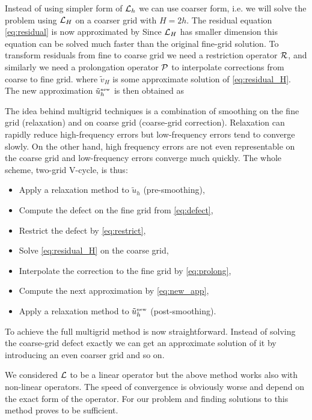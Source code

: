 Instead of using simpler form of $\mathcal{L}_h$ we can use coarser form, i.e. we will solve the problem using $\mathcal{L}_H$ on a coarser grid with $H=2h$. The residual equation \eqref{eq:residual} is now approximated by
Since $\mathcal{L}_H$ has smaller dimension this equation can be solved much faster than the original fine-grid solution. To transform residuals from fine to coarse grid we need a restriction operator $\mathcal{R}$, and similarly we need a  prolongation operator $\mathcal{P}$ to interpolate corrections from coarse to fine grid.
where $\tilde v_H$ is some approximate solution of \eqref{eq:residual_H}. The new approximation $\tilde u_h^\text{\tiny new}$ is then obtained as

The idea behind multigrid techniques is a combination of smoothing on the fine grid (relaxation) and on coarse grid (coarse-grid correction). Relaxation can rapidly reduce high-frequency errors but low-frequency errors tend to converge slowly. On the other hand, high frequency errors are not even representable on the coarse grid and low-frequency errors converge much quickly. The whole scheme, two-grid V-cycle, is thus:
\begin{itemize}
    \item Apply a relaxation method to $\tilde u_h$ (pre-smoothing),
    \item Compute the defect on the fine grid from \eqref{eq:defect},
    \item Restrict the defect by \eqref{eq:restrict},
    \item Solve \eqref{eq:residual_H} on the coarse grid,
    \item Interpolate the correction to the fine grid by \eqref{eq:prolong},
    \item Compute the next approximation by \eqref{eq:new_app},
    \item Apply a relaxation method to $\tilde u_h^\text{\tiny new}$ (post-smoothing).
\end{itemize}
To achieve the full multigrid method is now straightforward. Instead of solving the coarse-grid defect exactly we can get an approximate solution of it by introducing an even coarser grid and so on.

We considered $\mathcal{L}$ to be a linear operator but the above method works also with non-linear operators. The speed of convergence is obviously worse and depend on the exact form of the operator. For our problem and finding solutions to  this method proves to be sufficient.

